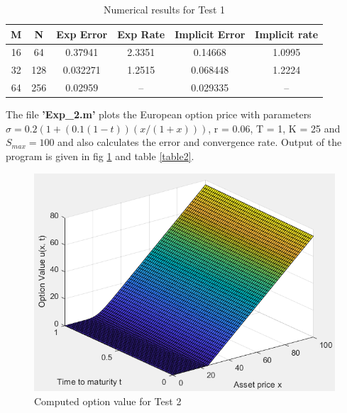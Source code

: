 \bgroup
\def\arraystretch{1.5}
\begin{table}[H]
    \caption{Numerical results for Test 1}    %
    \label{table1}
    \vspace{1mm}
    \centering                              %
    \begin{tabular}{c c c c c c}              %
    \hline\hline                            %
    M & N & Exp Error & Exp Rate & Implicit Error & Implicit rate \\ [0.5ex] 
    \hline                              %
    16 & 64 & 0.37941 & 2.3351 & 0.14668 & 1.0995 \\
    32 & 128 & 0.032271 & 1.2515 & 0.068448 & 1.2224 \\
    64 & 256 & 0.02959 & -- & 0.029335 & -- \\ [1ex]         %
    \hline                              %
    \end{tabular}
    \label{table:nonlin}                %
\end{table}
\egroup



The file \textbf{'Exp\_2.m'} plots the European option price with parameters $\sigma = 0.2(1 + (0.1(1 - t))(x/(1+x)))$, r = 0.06, T = 1, K = 25 and $S_{max} = 100$ and also calculates the error and convergence rate. Output of the program is given in fig \ref{fig2} and table \ref{table2}.

\begin{figure}[h]
\centering
\includegraphics[width=1\textwidth]{figures/fig2.PNG}
\caption{Computed option value for Test 2}
\label{fig2}
\end{figure}

